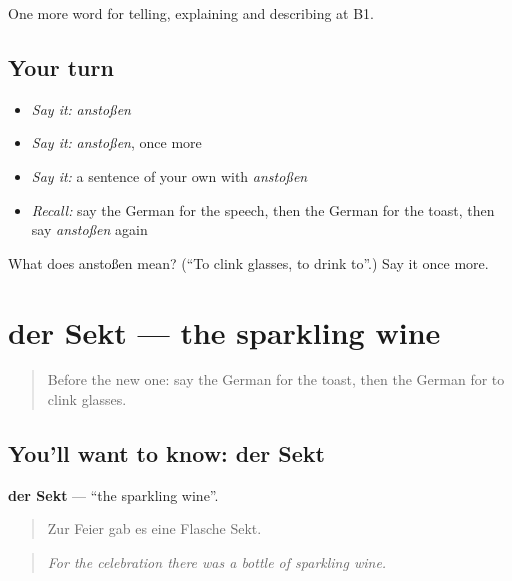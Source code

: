 \begin{grammarlens}[title={What you've built}]
One more word for telling, explaining and describing at B1.
\end{grammarlens}

\subsection*{Your turn}
\begin{itemize}
\raggedright
  \item \emph{Say it:} \emph{anstoßen}
  \item \emph{Say it:} \emph{anstoßen}, once more
  \item \emph{Say it:} a sentence of your own with \emph{anstoßen}
  \item \emph{Recall:} say the German for the speech, then the German for the toast, then say \emph{anstoßen} again
\end{itemize}

\begin{tcolorbox}[breakable,colback=teal!4,colframe=teal!35!black,title={Before you move on}]
What does anstoßen mean? (\textquotedblleft{}To clink glasses, to drink to\textquotedblright{}.) Say it once more.
\end{tcolorbox}
\section[der Sekt]{der Sekt — the sparkling wine}

\label{lesson:GE-C308-sekt}



\begin{quote}
Before the new one: say the German for the toast, then the German for to clink glasses.
\end{quote}

\subsection*{You'll want to know: der Sekt}
\textbf{der Sekt} — \textquotedblleft{}the sparkling wine\textquotedblright{}.

\begin{quote}
Zur Feier gab es eine Flasche Sekt.
\end{quote}

\begin{quote}
\emph{For the celebration there was a bottle of sparkling wine.}
\end{quote}

